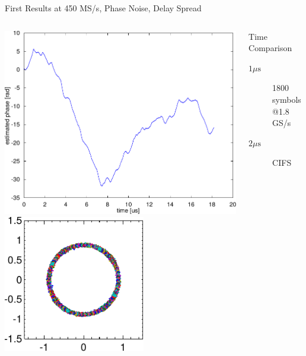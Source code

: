 \documentclass[10pt]{beamer}
\begin{document}
\begin{frame}{First Results at 450 MS/s, Phase Noise, Delay Spread}
  \begin{columns}[T]
    \begin{column}{.5\textwidth}
      \centering
      \includegraphics[width=\textwidth]{figures/matlab/res_450_qam4_phase_est} \\
      \includegraphics[width=0.6\textwidth]{figures/matlab/res_450_qam4_pnoise} \\
    \end{column}
    \begin{column}{.5\textwidth}
      \centering
      \begin{block}{Time Comparison}
        \begin{description}
        \item[$1 \mu \text{s}$] 1800 symbols @1.8 GS/s
        \item[$2 \mu \text{s}$] CIFS
        \end{description}
      \end{block}


\end{column}
\end{columns}
\end{frame}
\end{document}
